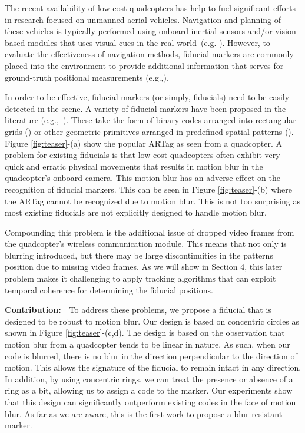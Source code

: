 \documentclass[runningheads]{llncs}
\begin{document}
The recent availability of low-cost quadcopters has help to fuel significant efforts in
research focused on unmanned aerial vehicles.  Navigation and planning of
these vehicles is typically performed using onboard inertial sensors and/or
vision based modules that uses visual cues in the real world~(e.g.
\cite{Davison:2007,Engel12,Engel13}). However, to evaluate the effectiveness of
navigation methods, fiducial markers are commonly placed into the environment
to provide additional information that serves for ground-truth
positional measurements (e.g.,\cite{Bosnak:2012,Lim09,Klopschitz:2007}).

In order to be effective, fiducial markers (or simply, fiducials) need
to be easily detected in the scene.  A variety of fiducial markers
have been proposed in the literature
(e.g.,~\cite{NaimarkF02,ARToolkit02,Fiala05,Pitag13,runetag11}).
These take the form of binary codes arranged into rectangular grids (\cite{ARToolkit02,Fiala05})
or other geometric primitives arranged in predefined spatial patterns
(\cite{NaimarkF02,Pitag13,runetag11}).
Figure \ref{fig:teaser}-(a) show the popular ARTag\cite{Fiala05} as
seen from a quadcopter.  A problem for existing fiducials is that low-cost quadcopters
often exhibit very quick and erratic physical movements that
results in motion blur in the quadcopter's onboard camera.  This motion blur has
an adverse effect on the  recognition of fiducial  markers.  This can be seen in
Figure \ref{fig:teaser}-(b) where the ARTag cannot be recognized due to motion
blur. This is not too surprising as most  existing fiducials are not explicitly
designed to handle motion blur.

Compounding this problem is the additional issue of dropped video frames from
the quadcopter's wireless communication module.   This means that not only is blurring
introduced, but there may be large discontinuities in the patterns position due
to missing video frames.  As we will show in Section 4, this later problem
makes it challenging to apply tracking algorithms that can exploit temporal
coherence for determining the fiducial positions.

\noindent\textbf{Contribution:}~~To address these problems, we propose a
fiducial that is designed to be robust to motion blur.  Our design is based on
concentric circles as shown in Figure \ref{fig:teaser}-(c,d).  The design is based
on the observation that motion blur from a quadcopter tends to be linear in
nature.  As such, when our code is blurred, there is no blur in the direction
perpendicular to the direction of motion.   This allows the signature of the
fiducial to remain intact in any direction.  In addition, by using concentric
rings, we can treat the presence or absence of a ring as a bit, allowing us to
assign a code to the marker.  Our experiments show that this design can
significantly outperform existing codes in the face of motion blur. As far as
we are aware, this is the first work to propose a blur resistant marker.
\end{document}
